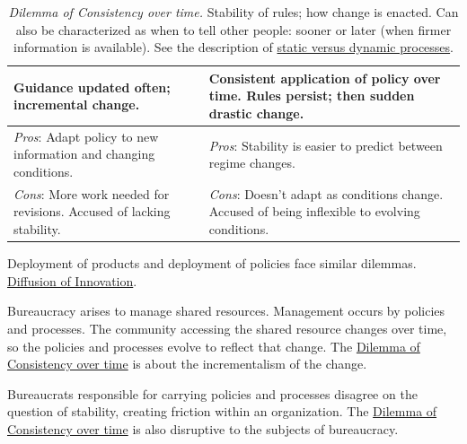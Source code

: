 \begin{center}
\begin{table}[H] %
\begin{tabular}{ | m{\dilemmatablewidth}| m{\dilemmatablewidth} | } 
  \hline
  \textbf{Guidance updated often; incremental change.} & 
  \textbf{Consistent application of policy over time. Rules persist; then sudden drastic change.} \\ 
  \hline
  \textit{Pros}: Adapt policy to new information and changing conditions. &
  \textit{Pros}: Stability is easier to predict between regime changes.  \\
  \hline
  \textit{Cons}: More work needed for revisions. Accused of lacking stability. & 
  \textit{Cons}: Doesn't adapt as conditions change. Accused of being inflexible to evolving conditions. \\
  \hline
\end{tabular}
\caption{
\textit{Dilemma of Consistency over time.} 
Stability of rules; how change is enacted. Can also be characterized as when to tell other people: sooner or later (when firmer information is available).
See the description of 
\hyperref[sec:static-dynamic-processes]{static versus dynamic processes}.
}
\label{table:consistency}
\end{table}
\end{center}

Deployment of products and deployment of policies face similar dilemmas. \href{https://en.wikipedia.org/wiki/Diffusion_of_innovations}{Diffusion of Innovation}.

Bureaucracy arises to manage shared resources. Management occurs by policies and processes. The community accessing the shared resource changes over time, so the policies and processes evolve to reflect that change. The \href{table:consistency}{Dilemma of Consistency over time} is about the incrementalism of the change.

Bureaucrats responsible for carrying policies and processes disagree on the question of stability, creating friction within an organization.
The \href{table:consistency}{Dilemma of Consistency over time} is also disruptive to the subjects of bureaucracy. 

